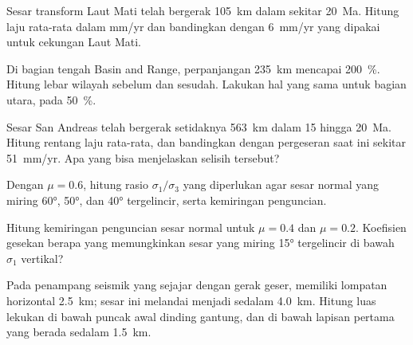\begin{exercise}[$\star$]\label{exo:b3:extension-strike-slip:3}
Sesar transform Laut Mati telah bergerak \qty{105}{km} dalam sekitar \qty{20}{Ma}.
Hitung laju rata-rata dalam \unit{mm/yr} dan bandingkan dengan \qty{6}{mm/yr}
yang dipakai untuk cekungan Laut Mati.
\end{exercise}

\begin{exercise}[$\star$]\label{exo:b3:extension-strike-slip:4}
Di bagian tengah Basin and Range, perpanjangan \qty{235}{km} mencapai
\qty{200}{\percent}. Hitung lebar wilayah sebelum dan sesudah. Lakukan hal yang sama
untuk bagian utara, pada \qty{50}{\percent}.
\end{exercise}

\begin{exercise}[$\star\star$]\label{exo:b3:extension-strike-slip:5}
Sesar San Andreas telah bergerak setidaknya \qty{563}{km} dalam 15 hingga
\qty{20}{Ma}. Hitung rentang laju rata-rata, dan bandingkan dengan
pergeseran saat ini sekitar \qty{51}{mm/yr}. Apa yang bisa menjelaskan selisih tersebut?
\end{exercise}

\begin{exercise}[$\star\star$]\label{exo:b3:extension-strike-slip:6}
Dengan $\mu = 0.6$, hitung rasio $\sigma_1/\sigma_3$ yang diperlukan agar sesar normal
yang miring \ang{60}, \ang{50}, dan \ang{40} tergelincir, serta kemiringan penguncian.
\end{exercise}

\begin{exercise}[$\star\star$]\label{exo:b3:extension-strike-slip:7}
Hitung kemiringan penguncian sesar normal untuk $\mu = 0.4$ dan $\mu = 0.2$.
Koefisien gesekan berapa yang memungkinkan sesar yang miring \ang{15} tergelincir di bawah
$\sigma_1$ vertikal?
\end{exercise}

\begin{exercise}[$\star\star$]\label{exo:b3:extension-strike-slip:8}
Pada penampang seismik yang sejajar dengan gerak geser,  memiliki
lompatan horizontal \qty{2.5}{km}; sesar ini melandai menjadi  sedalam \qty{4.0}{km}. Hitung
luas lekukan di bawah puncak awal dinding gantung, dan di bawah lapisan
pertama yang berada sedalam \qty{1.5}{km}.
\end{exercise}

